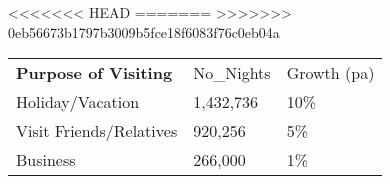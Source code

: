 <<<<<<< HEAD
=======
>>>>>>> 0eb56673b1797b3009b5fce18f6083f76c0eb04a
\begin{tabular}[t]{p{5cm}p{1.3cm}p{1.2cm}}
 \textbf{Purpose of Visiting} & No\_Nights & Growth (pa) \\ 
 Holiday/Vacation & 1,432,736 & 10\% \\ 
  Visit Friends/Relatives &   920,256 & 5\% \\ 
  Business &   266,000 & 1\% \\ 
  \end{tabular}
